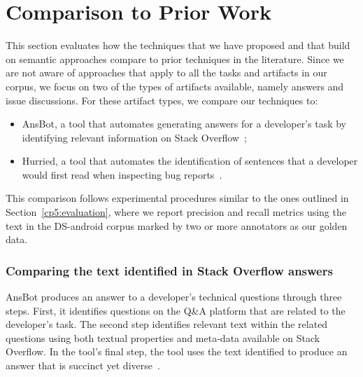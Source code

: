\section{Comparison to Prior Work}
\label{cp5:comparison}



This section evaluates how the techniques that we have proposed and that build on semantic approaches
compare to prior techniques in the literature. Since we are not aware of approaches that apply to all the tasks and artifacts in our corpus, we focus on two of the types of artifacts available, 
namely  answers and  issue discussions.
For these artifact types, we compare our techniques to: 



\begin{itemize}
    \item \acf{AnsBot}, a tool that automates generating answers for a developer's task by identifying relevant information on Stack Overflow~\cite{Xu2017};
    \item \acf{Hurried}, a tool that automates the identification of sentences that a developer would first read when inspecting bug reports~\cite{Lotufo2012}.
\end{itemize}



This comparison follows experimental procedures similar to the ones outlined in Section~\ref{cp5:evaluation},
where we report precision and recall metrics using the text in the \acs{DS-android} corpus marked by two or more annotators
as our golden data.




\subsubsection{Comparing the text identified in Stack Overflow answers}
\label{cp5:comparison-answerbot}


\acs{AnsBot} produces an answer to a developer's technical questions through three steps. 
First, it identifies questions on the Q\&A platform that are related to the developer's task. 
The second step identifies relevant text within the related questions
using both textual properties and meta-data available on Stack Overflow. 
In the tool's final step, the tool uses the text identified to produce an answer that is succinct yet diverse~\cite{Xu2017}.


